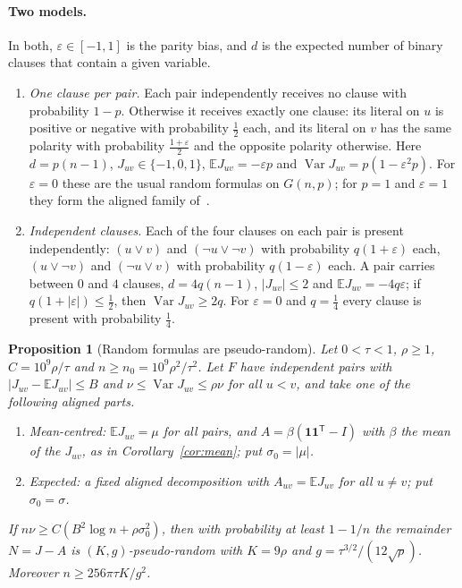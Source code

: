 \documentclass[11pt,a4paper]{article}
\newtheorem{proposition}[theorem]{Proposition}
\theoremstyle{definition}
\theoremstyle{remark}
\newcommand{\E}{\mathbb E}
\begin{document}
\paragraph{Two models.} In both, $\varepsilon\in[-1,1]$ is the parity bias,
and $d$ is the expected number of binary clauses that contain a given variable.
\begin{enumerate}
 \item[(a)] \emph{One clause per pair.} Each pair independently receives no
 clause with probability $1-p$. Otherwise it receives exactly one clause: its
 literal on $u$ is positive or negative with probability $\frac12$ each, and
 its literal on $v$ has the same polarity with probability
 $\frac{1+\varepsilon}2$ and the opposite polarity otherwise. Here $d=p(n-1)$,
 $J_{uv}\in\{-1,0,1\}$, $\E J_{uv}=-\varepsilon p$ and
 $\operatorname{Var}J_{uv}=p(1-\varepsilon^2p)$. For $\varepsilon=0$ these are
 the usual random formulas on $G(n,p)$; for $p=1$ and $\varepsilon=1$ they
 form the aligned family of~\cite[Section~4]{RG}.
 \item[(b)] \emph{Independent clauses.} Each of the four clauses on each pair
 is present independently: $(u\lor v)$ and $(\neg u\lor\neg v)$ with
 probability $q(1+\varepsilon)$ each, $(u\lor\neg v)$ and $(\neg u\lor v)$
 with probability $q(1-\varepsilon)$ each. A pair carries between $0$ and $4$
 clauses, $d=4q(n-1)$, $|J_{uv}|\le2$ and $\E J_{uv}=-4q\varepsilon$; if
 $q(1+|\varepsilon|)\le\frac12$, then $\operatorname{Var}J_{uv}\ge2q$. For
 $\varepsilon=0$ and $q=\frac14$ every clause is present with probability
 $\frac14$.
\end{enumerate}

\begin{proposition}[Random formulas are pseudo-random]\label{prop:random}
Let $0<\tau<1$, $\rho\ge1$, $C=10^9\rho/\tau$ and $n\ge n_0=10^9\rho^2/\tau^2$.
Let $F$ have independent pairs with $|J_{uv}-\E J_{uv}|\le B$ and
$\nu\le\operatorname{Var}J_{uv}\le\rho\nu$ for all $u<v$, and take one of the
following aligned parts.
\begin{enumerate}
 \item[(i)] \emph{Mean-centred}: $\E J_{uv}=\mu$ for all pairs, and
 $A=\beta(\mathbf 1\mathbf 1^{\mathsf T}-I)$ with $\beta$ the mean of the
 $J_{uv}$, as in Corollary~\ref{cor:mean}; put $\sigma_0=|\mu|$.
 \item[(ii)] \emph{Expected}: a fixed aligned decomposition with
 $A_{uv}=\E J_{uv}$ for all $u\ne v$; put $\sigma_0=\sigma$.
\end{enumerate}
If $n\nu\ge C(B^2\log n+\rho\sigma_0^2)$, then with probability at least
$1-1/n$ the remainder $N=J-A$ is $(K,g)$-pseudo-random with $K=9\rho$ and
$g=\tau^{3/2}/(12\sqrt\rho)$. Moreover $n\ge256\pi\tau K/g^2$.
\end{proposition}
\end{document}
